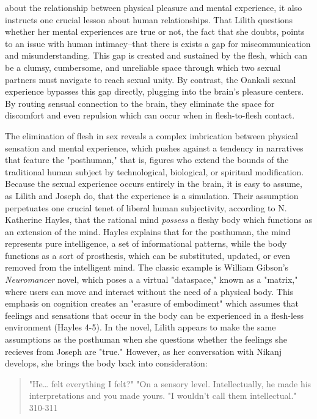 \documentclass[11pt]{article}
\begin{document}
about the relationship between physical pleasure and mental
experience, it also instructs one crucial lesson about human
relationships. That Lilith questions whether her mental experiences
are true or not, the fact that she doubts, points to an issue with
human intimacy--that there is exists a gap for miscommunication and
misunderstanding. This gap is created and sustained by the flesh,
which can be a clumsy, cumbersome, and unreliable space through which
two sexual partners must navigate to reach sexual unity. By contrast,
the Oankali sexual experience bypasses this gap directly, plugging
into the brain's pleasure centers. By routing sensual connection to
the brain, they eliminate the space for discomfort and even repulsion
which can occur when in flesh-to-flesh contact.

The elimination of flesh in sex reveals a complex imbrication between
physical sensation and mental experience, which pushes against a
tendency in narratives that feature the "posthuman," that is, figures
who extend the bounds of the traditional human subject by
technological, biological, or spiritual modification. Because the
sexual experience occurs entirely in the brain, it is easy to assume,
as Lilith and Joseph do, that the experience is a simulation. Their
assumption perpetuates one crucial tenet of liberal human
subjectivity, according to N. Katherine Hayles, that the rational mind
\emph{possess} a fleshy body which functions as an extension of the
mind. Hayles explains that for the posthuman, the mind represents pure
intelligence, a set of informational patterns, while the body
functions as a sort of prosthesis, which can be substituted, updated,
or even removed from the intelligent mind. The classic example is
William Gibson's \emph{Neuromancer} novel, which poses a a virtual
"dataspace," known as a "matrix," where users can move and interact
without the need of a physical body. This emphasis on cognition
creates an "erasure of embodiment" which assumes that feelings and
sensations that occur in the body can be experienced in a flesh-less
environment (Hayles 4-5). In the novel, Lilith appears to make the
same assumptions as the posthuman when she questions whether the
feelings she recieves from Joseph are "true." However, as her
conversation with Nikanj develops, she brings the body back into
consideration:
\begin{quote}
"He\ldots{} felt everything I felt?"
"On a sensory level. Intellectually, he made his interpretations and
you made yours.
"I wouldn't call them intellectual." 310-311
\end{quote}
\end{document}
